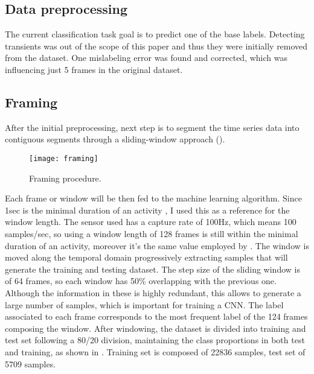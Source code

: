 \subsection{Data preprocessing}
\label{sec:data_preprocessing}
The current classification task goal is to predict one of the base labels. Detecting transients was out of the scope of this paper and thus they were initially removed from the dataset. One mislabeling error was found and corrected, which was influencing just 5 frames in the original dataset.

\subsection{Framing}
\label{sec:framing}
After the initial preprocessing, next step is to segment the time series data into contiguous segments through a \mbox{sliding-window} approach ().\\

\begin{figure}[h]
	\captionsetup{font=scriptsize, justification=centering}
    \centering
	\texttt{[image: framing]}
    \caption{Framing procedure.}
    \label{fig:img_framing}
\end{figure}

Each frame or window will be then fed to the machine learning algorithm. Since 1sec is the minimal duration of an activity \cite{base-paper}, I used this as a reference for the window length. The sensor used has a capture rate of 100Hz, which means 100 \mbox{samples/sec}, so using a window length of 128 frames is still within the minimal duration of an activity, moreover it's the same value employed by \cite{base-paper}. The window is moved along the temporal domain progressively extracting samples that will generate the training and testing dataset. The step size of the sliding window is of 64 frames, so each window has 50\% overlapping with the previous one. Although the information in these is highly redundant, this allows to generate a large number of samples, which is important for training a CNN. The label associated to each frame corresponds to the most frequent label of the 124 frames composing the window.
After windowing, the dataset is divided into training and test set following a \mbox{80/20} division, maintaining the class proportions in both test and training, as shown in . Training set is composed of 22836 samples, test set of 5709 samples.

